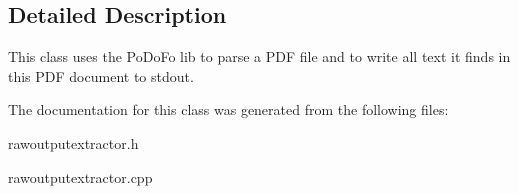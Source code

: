 \subsection{Detailed Description}
This class uses the Po\+Do\+Fo lib to parse a P\+DF file and to write all text it finds in this P\+DF document to stdout. 

The documentation for this class was generated from the following files\+:\begin{DoxyCompactItemize}
\item 
rawoutputextractor.\+h\item 
rawoutputextractor.\+cpp\end{DoxyCompactItemize}
